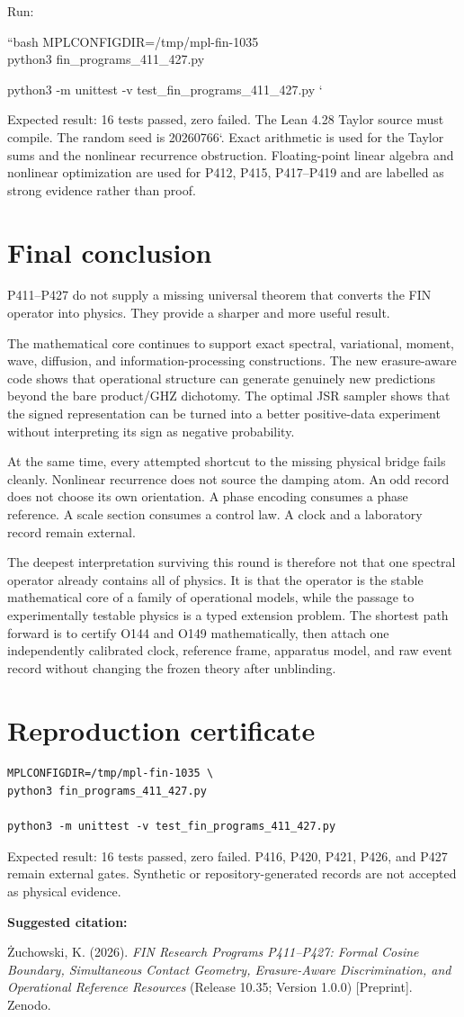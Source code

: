 \documentclass[11pt,a4paper,openany]{report}
\begin{document}
Run:

``bash MPLCONFIGDIR=/\allowbreak{}tmp/\allowbreak{}mpl-fin-1035 \\
python3 fin\_programs\_411\_427.py

python3 -m unittest -v test\_fin\_programs\_411\_427.py `

Expected result: 16 tests passed, zero failed. The Lean 4.28 Taylor source must compile. The random seed is 20260766`. Exact arithmetic is used for the Taylor sums and the nonlinear recurrence obstruction. Floating-point linear algebra and nonlinear optimization are used for P412, P415, P417--P419 and are labelled as strong evidence rather than proof.

\chapter{Final conclusion}

P411--P427 do not supply a missing universal theorem that converts the FIN operator into physics. They provide a sharper and more useful result.

The mathematical core continues to support exact spectral, variational, moment, wave, diffusion, and information-processing constructions. The new erasure-aware code shows that operational structure can generate genuinely new predictions beyond the bare product/\allowbreak{}GHZ dichotomy. The optimal JSR sampler shows that the signed representation can be turned into a better positive-data experiment without interpreting its sign as negative probability.

At the same time, every attempted shortcut to the missing physical bridge fails cleanly. Nonlinear recurrence does not source the damping atom. An odd record does not choose its own orientation. A phase encoding consumes a phase reference. A scale section consumes a control law. A clock and a laboratory record remain external.

The deepest interpretation surviving this round is therefore not that one spectral operator already contains all of physics. It is that the operator is the stable mathematical core of a family of operational models, while the passage to experimentally testable physics is a typed extension problem. The shortest path forward is to certify O144 and O149 mathematically, then attach one independently calibrated clock, reference frame, apparatus model, and raw event record without changing the frozen theory after unblinding.


\clearpage
\chapter*{Reproduction certificate}
\begin{Verbatim}[fontsize=\small]
MPLCONFIGDIR=/tmp/mpl-fin-1035 \
python3 fin_programs_411_427.py

python3 -m unittest -v test_fin_programs_411_427.py
\end{Verbatim}
Expected result: 16 tests passed, zero failed. P416, P420, P421, P426, and
P427 remain external gates. Synthetic or repository-generated records are
not accepted as physical evidence.

\medskip
\noindent\textbf{Suggested citation:}

\.Zuchowski, K. (2026). \emph{FIN Research Programs P411--P427: Formal Cosine
Boundary, Simultaneous Contact Geometry, Erasure-Aware Discrimination, and
Operational Reference Resources} (Release 10.35; Version 1.0.0) [Preprint].
Zenodo.
\end{document}
